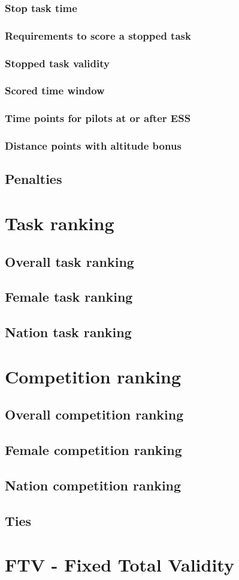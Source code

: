 \documentclass{article}
\begin{document}
\subsubsection{Stop task time}
\subsubsection{Requirements to score a stopped task}
\subsubsection{Stopped task validity}
\subsubsection{Scored time window}
\subsubsection{Time points for pilots at or after ESS}
\subsubsection{Distance points with altitude bonus}
\label{sec:distance-stopped-tasks}
\subsection{Penalties}

\newpage
\section{Task ranking}
\subsection{Overall task ranking}
\subsection{Female task ranking}
\subsection{Nation task ranking}

\newpage
\section{Competition ranking}
\subsection{Overall competition ranking}
\subsection{Female competition ranking}
\subsection{Nation competition ranking}
\subsection{Ties}

\newpage
\section{FTV - Fixed Total Validity}
\end{document}

